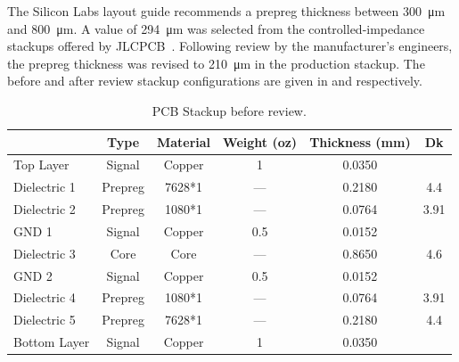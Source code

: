 The Silicon Labs layout guide recommends a prepreg thickness between \SI{300}{\micro\meter} and \SI{800}{\micro\meter}. A value of \SI{294}{\micro\meter} was selected from the controlled-impedance stackups offered by JLCPCB~\cite{jlcpcb_impedance_stackup}. Following review by the manufacturer's engineers, the prepreg thickness was revised to \SI{210}{\micro\meter} in the production stackup. The before and after review stackup configurations are given in  and  respectively.

\begin{table}[H]
\centering
\caption{PCB Stackup before review.}
\label{tab:INIT_PCBStackup}
\begin{tabular}{@{}lcccSS@{}}
\toprule
                    & {Type}  & {Material}    & {Weight (oz)} & {Thickness (mm)} & {Dk} \\
\midrule
Top Layer           & Signal  & Copper        & 1             & 0.0350           &         \\ 
\midrule
Dielectric 1        & Prepreg & 7628*1        & ---           & 0.2180           & 4.4     \\ 
Dielectric 2        & Prepreg & 1080*1        & ---           & 0.0764           & 3.91    \\ 
\midrule
GND 1               & Signal  & Copper        & 0.5           & 0.0152           &         \\ 
\midrule
Dielectric 3        & Core    & Core          & ---           & 0.8650           & 4.6     \\ 
\midrule
GND 2               & Signal  & Copper        & 0.5           & 0.0152           &         \\
\midrule
Dielectric 4        & Prepreg & 1080*1        & ---           & 0.0764           & 3.91    \\
Dielectric 5        & Prepreg & 7628*1        & ---           & 0.2180           & 4.4     \\ 
\midrule
Bottom Layer        & Signal  & Copper        & 1             & 0.0350           &         \\ 
\bottomrule
\end{tabular}
\end{table}

